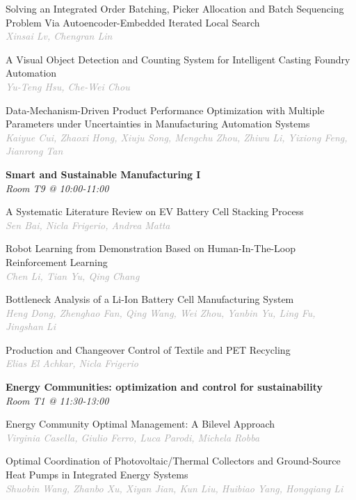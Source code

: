 \begin{multicols*}{2}
\small Solving an Integrated Order Batching, Picker Allocation and Batch Sequencing Problem Via Autoencoder-Embedded Iterated Local Search\\ 
\footnotesize \textcolor{darkgray}{\textit{Xinsai Lv, Chengran  Lin}}

\small A Visual Object Detection and Counting System for Intelligent Casting Foundry Automation\\ 
\footnotesize \textcolor{darkgray}{\textit{Yu-Teng Hsu, Che-Wei  Chou}}

\small Data-Mechanism-Driven Product Performance Optimization with Multiple Parameters under Uncertainties in Manufacturing Automation Systems\\ 
\footnotesize \textcolor{darkgray}{\textit{Kaiyue Cui, Zhaoxi  Hong, Xiuju  Song, Mengchu  Zhou, Zhiwu  Li, Yixiong  Feng, Jianrong  Tan}}

\normalsize \textbf{Smart and Sustainable Manufacturing I}\\
\small \textit{Room T9 @ 10:00-11:00}

\small A Systematic Literature Review on EV Battery Cell Stacking Process\\ 
\footnotesize \textcolor{darkgray}{\textit{Sen Bai, Nicla  Frigerio, Andrea  Matta}}

\small Robot Learning from Demonstration Based on Human-In-The-Loop Reinforcement Learning\\ 
\footnotesize \textcolor{darkgray}{\textit{Chen Li, Tian  Yu, Qing  Chang}}

\small Bottleneck Analysis of a Li-Ion Battery Cell Manufacturing System\\ 
\footnotesize \textcolor{darkgray}{\textit{Heng Dong, Zhenghao  Fan, Qing  Wang, Wei  Zhou, Yanbin  Yu, Ling  Fu, Jingshan  Li}}

\small Production and Changeover Control of Textile and PET Recycling\\ 
\footnotesize \textcolor{darkgray}{\textit{Elias El Achkar, Nicla  Frigerio}}

\normalsize \textbf{Energy Communities: optimization and control for sustainability}\\
\small \textit{Room T1 @ 11:30-13:00}

\small Energy Community Optimal Management: A Bilevel Approach\\ 
\footnotesize \textcolor{darkgray}{\textit{Virginia Casella, Giulio  Ferro, Luca  Parodi, Michela  Robba}}

\small Optimal Coordination of Photovoltaic/Thermal Collectors and Ground-Source Heat Pumps in Integrated Energy Systems\\ 
\footnotesize \textcolor{darkgray}{\textit{Shuobin Wang, Zhanbo  Xu, Xiyan  Jian, Kun  Liu, Huibiao  Yang, Hongqiang  Li}}


\end{multicols*}
